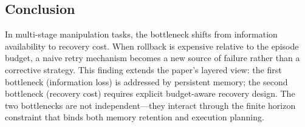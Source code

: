 \subsection{Conclusion}

In multi-stage manipulation tasks, the bottleneck shifts from information availability to recovery cost. When rollback is expensive relative to the episode budget, a naive retry mechanism becomes a new source of failure rather than a corrective strategy. This finding extends the paper's layered view: the first bottleneck (information loss) is addressed by persistent memory; the second bottleneck (recovery cost) requires explicit budget-aware recovery design. The two bottlenecks are not independent---they interact through the finite horizon constraint that binds both memory retention and execution planning.
